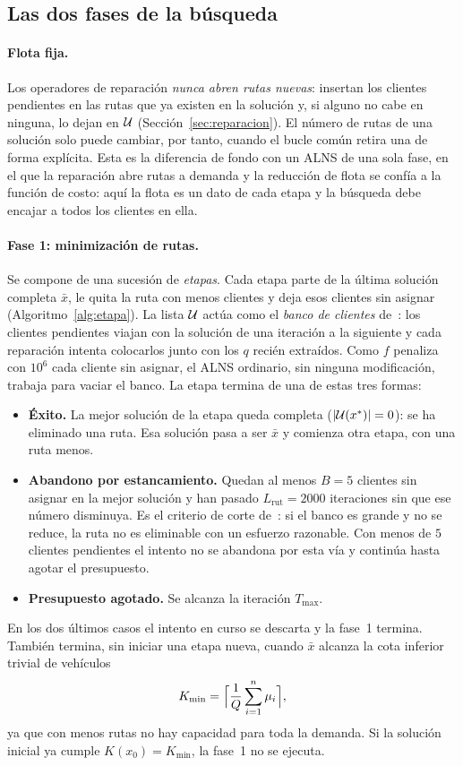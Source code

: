 \subsection{Las dos fases de la búsqueda}
\label{sec:fases}

\paragraph{Flota fija.} Los operadores de reparación \emph{nunca abren rutas nuevas}: insertan
los clientes pendientes en las rutas que ya existen en la solución y, si alguno no cabe en
ninguna, lo dejan en $\mathcal{U}$ (Sección~\ref{sec:reparacion}). El número de rutas de una
solución solo puede cambiar, por tanto, cuando el bucle común retira una de forma explícita.
Esta es la diferencia de fondo con un ALNS de una sola fase, en el que la reparación abre
rutas a demanda y la reducción de flota se confía a la función de costo: aquí la flota es un
dato de cada etapa y la búsqueda debe encajar a todos los clientes en ella.

\paragraph{Fase 1: minimización de rutas.} Se compone de una sucesión de \emph{etapas}. Cada
etapa parte de la última solución completa $\bar{x}$, le quita la ruta con menos clientes y
deja esos clientes sin asignar (Algoritmo~\ref{alg:etapa}). La lista $\mathcal{U}$ actúa como el
\emph{banco de clientes} de~\cite{ropke2006}: los clientes pendientes viajan con la solución
de una iteración a la siguiente y cada reparación intenta colocarlos junto con los $q$ recién
extraídos. Como $f$ penaliza con $10^6$ cada cliente sin asignar, el ALNS ordinario, sin
ninguna modificación, trabaja para vaciar el banco. La etapa termina de una de estas tres
formas:
\begin{itemize}
\item \textbf{Éxito.} La mejor solución de la etapa queda completa ($|\mathcal{U}(x^{*})|=0$): se ha
eliminado una ruta. Esa solución pasa a ser $\bar{x}$ y comienza otra etapa, con una ruta
menos.
\item \textbf{Abandono por estancamiento.} Quedan al menos $B=5$ clientes sin asignar en la
mejor solución y han pasado $L_{\mathrm{rut}}=2000$ iteraciones sin que ese número disminuya.
Es el criterio de corte de~\cite{ropke2006}: si el banco es grande y no se reduce, la ruta no
es eliminable con un esfuerzo razonable. Con menos de $5$ clientes pendientes el intento no se
abandona por esta vía y continúa hasta agotar el presupuesto.
\item \textbf{Presupuesto agotado.} Se alcanza la iteración $T_{\max}$.
\end{itemize}
En los dos últimos casos el intento en curso se descarta y la fase~1 termina. También termina,
sin iniciar una etapa nueva, cuando $\bar{x}$ alcanza la cota inferior trivial de vehículos
\begin{equation}
K_{\min}=\Bigl\lceil\frac{1}{Q}\sum_{i=1}^{n}\mu_i\Bigr\rceil ,
\label{eq:kmin}
\end{equation}
ya que con menos rutas no hay capacidad para toda la demanda. Si la solución inicial ya cumple
$K(x_0)=K_{\min}$, la fase~1 no se ejecuta.

